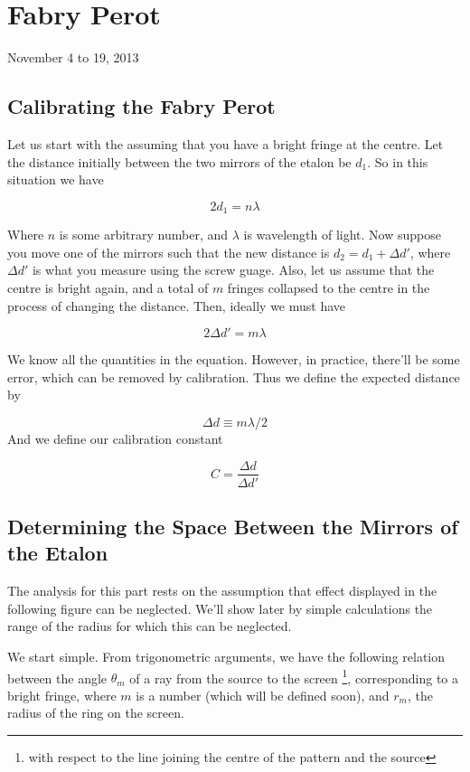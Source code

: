 \chapter{Fabry Perot}
\begin{flushright}
November 4 to 19, 2013 \\
\end{flushright}

\section{Calibrating the Fabry Perot}

Let us start with the assuming that you have a bright fringe at the
centre. Let the distance initially between the two mirrors of the
etalon be $d_{1}$. So in this situation we have

\[
2d_{1}=n\lambda
\]


Where $n$ is some arbitrary number, and $\lambda$ is wavelength
of light. Now suppose you move one of the mirrors such that the
new distance is $d_{2}=d_{1}+\Delta d'$, where $\Delta d'$ is what
you measure using the screw guage. Also, let us assume that the centre
is bright again, and a total of $m$ fringes collapsed to the centre
in the process of changing the distance. Then, ideally we must have

\[
2\Delta d'=m\lambda
\]


We know all the quantities in the equation. However, in practice,
there'll be some error, which can be removed by calibration. Thus
we define the expected distance by

\[
\Delta d\equiv m\lambda/2
\]
And we define our calibration constant

\[
C=\frac{\Delta d}{\Delta d'}
\]



\section{Determining the Space Between the Mirrors of the Etalon}

The analysis for this part rests on the assumption that effect displayed
in the following figure can be neglected. We'll show later by simple
calculations the range of the radius for which this can be neglected.

We start simple. From trigonometric arguments, we have the following
relation between the angle $\theta_{m}$ of a ray from the source
to the screen%
\footnote{with respect to the line joining the centre of the pattern and the
source%
}, corresponding to a bright fringe, where $m$ is a number (which
will be defined soon), and $r_{m}$, the radius of the ring on the
screen.

